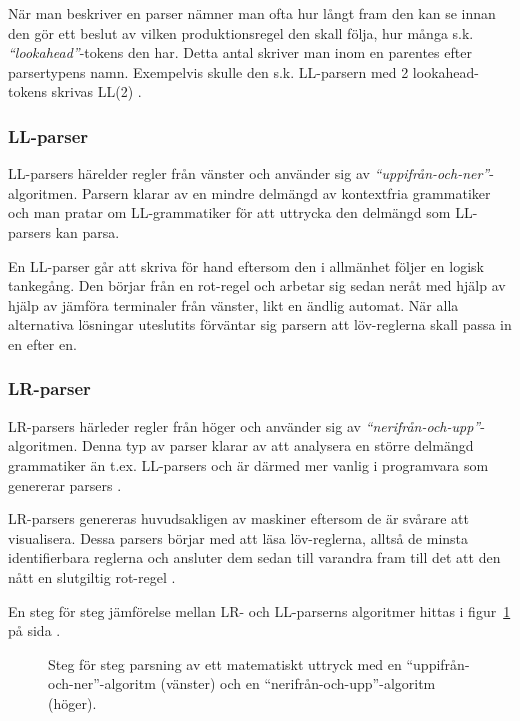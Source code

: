 När man beskriver en parser nämner man ofta hur långt fram den kan se innan
den gör ett beslut av vilken produktionsregel den skall följa, hur många s.k.
\textit{``lookahead''}-tokens den har. Detta antal skriver man inom en
parentes efter parsertypens namn. Exempelvis skulle den s.k. LL-parsern med 2
lookahead-tokens skrivas LL(2) \citep[s. 69]{sm09}.

\subsubsection{LL-parser}

LL-parsers härelder regler från vänster och använder sig av
\textit{``uppifrån-och-ner''}-algoritmen. Parsern klarar av en mindre delmängd
av kontextfria grammatiker och man pratar om LL-grammatiker för att uttrycka
den delmängd som LL-parsers kan parsa.

En LL-parser går att skriva för hand eftersom den i allmänhet följer en logisk
tankegång. Den börjar från en rot-regel och arbetar sig sedan neråt
med hjälp av hjälp av jämföra terminaler från vänster, likt en ändlig
automat. När alla alternativa lösningar uteslutits förväntar sig parsern att
löv-reglerna skall passa in en efter en.

\subsubsection{LR-parser}

LR-parsers härleder regler från höger och använder sig av
\textit{``nerifrån-och-upp''}-algoritmen. Denna typ av parser klarar av att
analysera en större delmängd grammatiker än t.ex. LL-parsers och är därmed mer
vanlig i programvara som genererar parsers \citep[s. 61]{aa06}.

LR-parsers genereras huvudsakligen av maskiner eftersom de är svårare att
visualisera. Dessa parsers börjar med att läsa löv-reglerna, alltså de minsta
identifierbara reglerna och ansluter dem sedan till varandra fram till det att
den nått en slutgiltig rot-regel \citep[s. 67]{sm09}.

En steg för steg jämförelse mellan LR- och LL-parserns algoritmer hittas i
figur~\ref{fig:ll-vs-lr} på sida \pageref{fig:ll-vs-lr}.

\begin{figure}[ht]
  \begin{minipage}[t]{0.5\textwidth}
  \end{minipage}%
  \begin{minipage}[t]{0.5\textwidth}
  \end{minipage}%
  \caption{Steg för steg parsning av ett matematiskt uttryck med en
    ``uppifrån-och-ner''-algoritm (vänster) och en
    ``nerifrån-och-upp''-algoritm (höger).}
  \label{fig:ll-vs-lr}
\end{figure}

